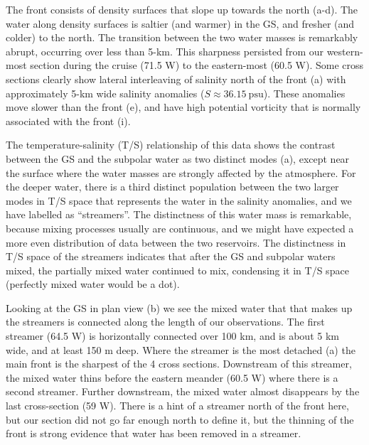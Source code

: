 \documentclass{natureJMK}
\begin{document}
The front consists of density surfaces that slope up towards the north (a-d).  The water along density surfaces is saltier (and warmer) in the GS, and fresher (and colder) to the north. The transition between the two water masses is remarkably abrupt, occurring over less than 5-km.  This sharpness persisted from our western-most section during the cruise (71.5 W) to the eastern-most (60.5 W). Some cross sections clearly show lateral interleaving of salinity north of the front (a) with approximately 5-km wide salinity anomalies ($S \approx 36.15\ \mathrm{psu}$).  These anomalies move slower than the front (e), and have high potential vorticity that is normally associated with the front (i).  

The temperature-salinity (T/S) relationship of this data shows the contrast between the GS and the subpolar water as two distinct modes (a), except near the surface where the water masses are strongly affected by the atmosphere.  For the deeper water, there is a third distinct population between the two larger modes in T/S space that represents the water in the salinity anomalies, and we have labelled as ``streamers''.  The distinctness of this water mass is remarkable, because mixing processes usually are continuous, and we might have expected a more even distribution of data between the two reservoirs.  The distinctness in T/S space of the streamers indicates that after the GS and subpolar waters mixed, the partially mixed water continued to mix, condensing it in T/S space (perfectly mixed water would be a dot).  

Looking at the GS in plan view (b) we see the mixed water that that makes up the streamers is connected along the length of our observations.  The first streamer (64.5 W) is horizontally connected over 100 km, and is about 5 km wide, and at least 150 m deep.  Where the streamer is the most detached (a) the main front is the sharpest of the 4 cross sections.    Downstream of this streamer, the mixed water thins before the eastern meander (60.5 W) where there is a second streamer.  Further downstream, the mixed water almost disappears by the last cross-section (59 W).  There is a hint of a streamer north of the front here, but our section did not go far enough north to define it, but the thinning of the front is strong evidence that water has been removed in a streamer.  
\end{document}
